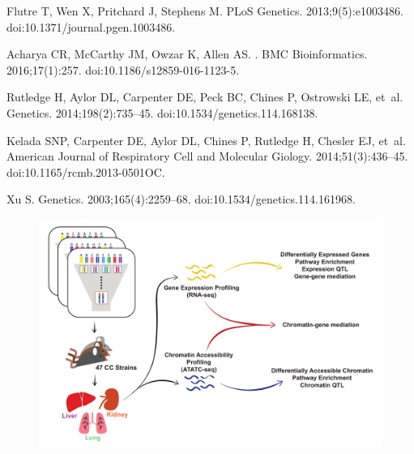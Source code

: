 \documentclass[10pt,letterpaper]{article}
\begin{document}
\begin{thebibliography}{10}
Flutre T, Wen X, Pritchard J, Stephens M.
\newblock PLoS Genetics. 2013;9(5):e1003486.
\newblock doi:{10.1371/journal.pgen.1003486}.

Acharya CR, McCarthy JM, Owzar K, Allen AS.
.
\newblock BMC Bioinformatics. 2016;17(1):257.
\newblock doi:{10.1186/s12859-016-1123-5}.

Rutledge H, Aylor DL, Carpenter DE, Peck BC, Chines P, Ostrowski LE, et~al.
\newblock Genetics. 2014;198(2):735--45.
\newblock doi:{10.1534/genetics.114.168138}.

Kelada SNP, Carpenter DE, Aylor DL, Chines P, Rutledge H, Chesler EJ, et~al.
\newblock American Journal of Respiratory Cell and Molecular Giology.
  2014;51(3):436--45.
\newblock doi:{10.1165/rcmb.2013-0501OC}.

Xu S.
\newblock Genetics. 2003;165(4):2259--68.
\newblock doi:{10.1534/genetics.114.161968}.

\end{thebibliography}

\newpage

\setcounter{table}{0}
\setcounter{figure}{0}
\setcounter{page}{1}


\begin{figure}[hp]
\includegraphics[width=\linewidth, clip, trim={0in 0.1in 0in 0.2in}]{figs/overview_diagram_simplified.pdf}
\caption{}
\end{figure}
\end{document}
